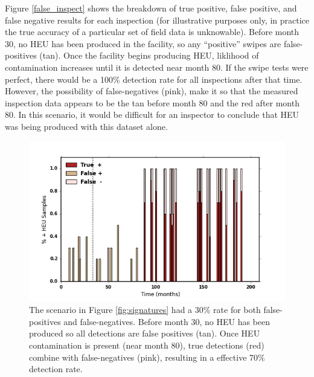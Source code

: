 Figure \ref{false_inspect} shows the breakdown of true positive, false positive, and false negative results for each inspection (for illustrative purposes only, in practice the true accuracy of a particular set of field data is unknowable).  Before month 30, no \gls{HEU} has been produced in the facility, so any ``positive'' swipes are false-positives (tan). Once the facility begins producing \gls{HEU}, liklihood of contamination increases until it is detected near month 80. If the swipe tests were perfect, there would be a 100\% detection rate for all inspections after that time. However, the possibility of false-negatives (pink), make it so that the measured inspection data appears to be the tan before month 80 and the red after month 80.  In this scenario, it would be difficult for an inspector to conclude that \gls{HEU} was being produced with this dataset alone.

\begin{figure}%
\begin{center}
\includegraphics[natwidth=162bp,natheight=227bp, scale=0.6]{./figs/mm_5enrich_tinytails_inspswipe_rates.png}
\end{center}
\caption{The scenario in Figure \ref{fig:signatures} had a 30\% rate for both false-positives and false-negatives. Before month 30, no HEU has been produced so all detections are false positives (tan). Once \gls{HEU} contamination is present (near month 80), true detections (red) combine with false-negatives (pink), resulting in a effective 70\% detection rate.}
\label{fig:false_inspect}
\end{figure}
